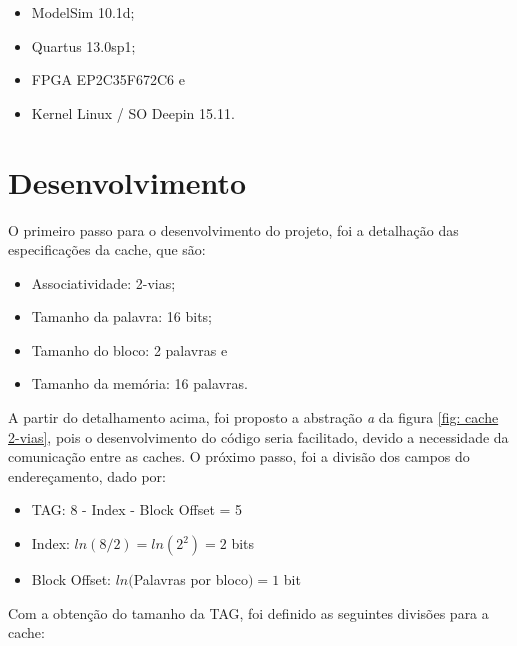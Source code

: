 \documentclass[12pt, a4paper]{article}
\begin{document}
	\begin{itemize}
		\item ModelSim 10.1d;
		\item Quartus 13.0sp1;
		\item FPGA EP2C35F672C6 e
		\item Kernel Linux / SO Deepin 15.11.
	\end{itemize}
	
    \section{Desenvolvimento}
    
	\par O primeiro passo para o desenvolvimento do projeto, foi a detalhação das especificações da cache, que são:

	\vspace{\baselineskip}

	\begin{itemize}
		\item Associatividade: 2-vias;
		\item Tamanho da palavra: 16 bits;
		\item Tamanho do bloco: 2 palavras e
		\item Tamanho da memória: 16 palavras.
	\end{itemize}

	\vspace{\baselineskip}

	\par A partir do detalhamento acima, foi proposto a abstração \textit{a} da figura \ref{fig: cache 2-vias}, pois o desenvolvimento do código seria facilitado, devido a necessidade da comunicação entre as caches. O próximo passo, foi a divisão dos campos do endereçamento, dado por:
	
	\vspace{\baselineskip}
	
	\begin{itemize}
		\item TAG: 8 - Index - Block Offset = 5
		\item Index: $ln(8/2) = ln(2^{2}) = 2$ bits
		\item Block Offset: $ln($Palavras por bloco$) = 1$ bit
	\end{itemize}

	\vspace{\baselineskip}

	\par Com a obtenção do tamanho da TAG, foi definido as seguintes divisões para a cache:
	
\end{document}
